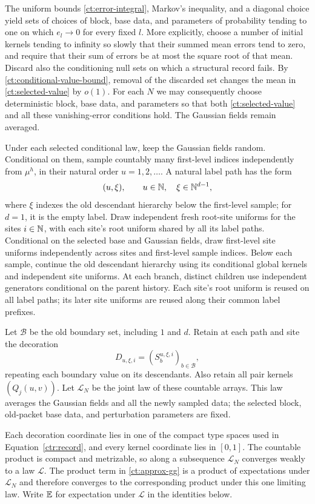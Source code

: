 The uniform bounds \eqref{ct:error-integral}, Markov's inequality,
and a diagonal choice yield sets of choices of block, base data, and parameters of
probability tending to one on which $e_l\to0$ for every fixed $l$.
More explicitly, choose a number of initial kernels tending to infinity
so slowly that their summed mean errors tend to zero, and require that
their sum of errors be at most the square root of that mean.  Discard
also the conditioning null sets on which a structural record fails.
By \eqref{ct:conditional-value-bound}, removal of the discarded
set changes the mean in \eqref{ct:selected-value} by $o(1)$.
For each $N$ we may consequently choose deterministic block, base data,
and parameters so that both \eqref{ct:selected-value} and all these
vanishing-error conditions hold.  The Gaussian fields remain averaged.

Under each selected conditional law, keep the Gaussian fields random.
Conditional on them, sample countably many first-level indices independently
from $\mu^h$, in their natural order $u=1,2,\ldots$. A natural label path
has the form
\[
 (u,\xi),\qquad u\in\mathbb N,\quad\xi\in\mathbb N^{d-1},
\]
where $\xi$ indexes the old descendant hierarchy below the first-level
sample; for $d=1$, it is the empty label. Draw independent fresh root-site uniforms for the sites $i\in\mathbb N$, with
each site's root uniform shared by all its label paths. Conditional on
the selected base and Gaussian fields, draw first-level site uniforms
independently across sites and first-level sample indices. Below each sample,
continue the old descendant hierarchy using its conditional global kernels
and independent site uniforms. At each branch, distinct children use independent generators conditional
on the parent history. Each site's root uniform is reused on all label
paths; its later site uniforms are reused along their common label
prefixes.

Let $\mathcal B$ be the old boundary set, including $1$ and $d$. Retain
at each path and site the decoration
\[
 D_{u,\xi,i}=(S_b^{u,\xi,i})_{b\in\mathcal B},
\]
repeating each boundary value on its descendants. Also retain all pair
kernels $(Q_j(u,v))$. Let $\mathcal L_N$ be the joint law of these
countable arrays. This law averages the Gaussian fields and all the newly
sampled data; the selected block, old-packet base data, and perturbation
parameters are fixed.

Each decoration coordinate lies in one of the compact type spaces used
in Equation~\eqref{ctr:record}, and every kernel coordinate lies in
$[0,1]$. The countable product is compact and metrizable, so along a
subsequence $\mathcal L_N$ converges weakly to a law $\mathcal L$.
The product term in \eqref{ct:approx-gg} is a product of expectations
under $\mathcal L_N$ and therefore converges to the corresponding product
under this one limiting law. Write $\mathbb E$ for expectation under
$\mathcal L$ in the identities below.

